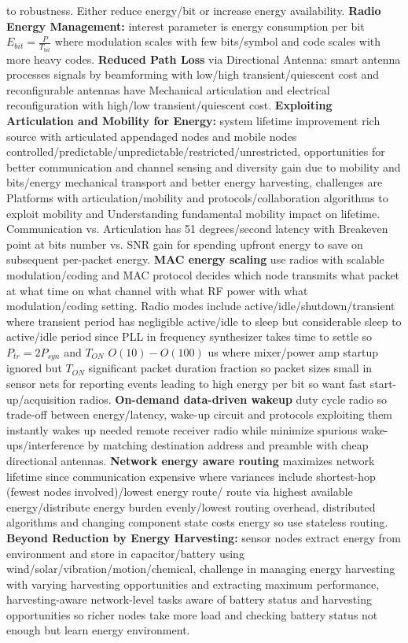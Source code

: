 \documentclass[9pt]{extarticle}
\begin{document}
\begin{multicols}{2}
to robustness. Either reduce energy/bit or increase energy availability. \textbf{Radio Energy Management:} interest parameter is energy consumption per bit $E_{bit}=\frac{P}{T_{bit}}$ where modulation scales with few bits/symbol and code scales with more heavy codes. \textbf{Reduced Path Loss} via Directional Antenna: smart antenna processes signals by beamforming with low/high transient/quiescent cost and reconfigurable antennas have Mechanical articulation and electrical reconfiguration with high/low transient/quiescent cost. \textbf{Exploiting Articulation and Mobility for Energy:} system lifetime improvement rich source with articulated appendaged nodes and mobile nodes controlled/predictable/unpredictable/restricted/unrestricted, opportunities for better communication and channel sensing and diversity gain due to mobility and bits/energy mechanical transport and better energy harvesting, challenges are Platforms with articulation/mobility and protocols/collaboration algorithms to exploit mobility and Understanding fundamental mobility impact on lifetime. Communication vs. Articulation has 51 degrees/second latency with Breakeven point at bits number vs. SNR gain for spending upfront energy to save on subsequent per-packet energy. \textbf{MAC energy scaling} use radios with scalable modulation/coding and MAC protocol decides which node transmits what packet at what time on what channel with what RF power with what modulation/coding setting. Radio modes include active/idle/shutdown/transient where transient period has negligible active/idle to sleep but considerable sleep to active/idle period since PLL in frequency synthesizer takes time to settle so $P_{tr} = 2P_{syn}$ and $T_{ON}$ $O(10)-O(100)$ us where mixer/power amp startup ignored but $T_{ON}$  significant packet duration fraction so packet sizes small in sensor nets for reporting events leading to high energy per bit so want fast start-up/acquisition radios. \textbf{On-demand data-driven wakeup} duty cycle radio so trade-off between energy/latency, wake-up circuit and protocols exploiting them instantly wakes up needed remote receiver radio while minimize spurious wake-ups/interference by matching destination address and preamble with cheap directional antennas. \textbf{Network energy aware routing} maximizes network lifetime since communication expensive where variances include shortest-hop (fewest nodes involved)/lowest energy route/ route via highest available energy/distribute energy burden evenly/lowest routing overhead, distributed algorithms and changing component state costs energy so use stateless routing. \textbf{Beyond Reduction by Energy Harvesting: }sensor nodes extract energy from environment and store in capacitor/battery using wind/solar/vibration/motion/chemical, challenge in managing energy harvesting with varying harvesting opportunities and extracting maximum performance, harvesting-aware network-level tasks aware of battery status and harvesting opportunities so richer nodes take more load and checking battery status not enough but learn energy environment.


\end{multicols}
\end{document}

